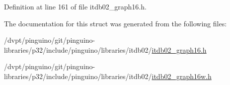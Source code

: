 Definition at line 161 of file itdb02\-\_\-graph16.\-h.



The documentation for this struct was generated from the following files\-:\begin{DoxyCompactItemize}
\item 
/dvpt/pinguino/git/pinguino-\/libraries/p32/include/pinguino/libraries/itdb02/\hyperlink{itdb02__graph16_8h}{itdb02\-\_\-graph16.\-h}\item 
/dvpt/pinguino/git/pinguino-\/libraries/p32/include/pinguino/libraries/itdb02/\hyperlink{itdb02__graph16w_8h}{itdb02\-\_\-graph16w.\-h}\end{DoxyCompactItemize}
